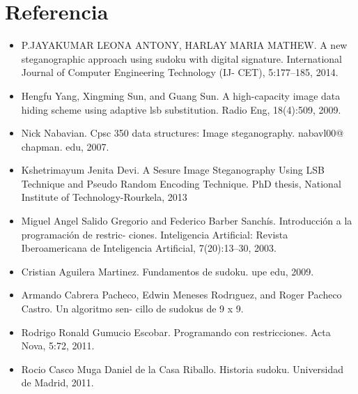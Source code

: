 \documentclass[14pt]{article}
\begin{document}
\newpage

\section{Referencia}
	\begin{itemize}
		\item  [\fbox {1}] P.JAYAKUMAR LEONA ANTONY, HARLAY MARIA MATHEW. A new steganographic approach using sudoku with digital signature. International Journal of Computer Engineering  Technology (IJ- CET), 5:177–185, 2014.
	\end{itemize}
	\begin{itemize}
	\item  [\fbox {2}] Hengfu Yang, Xingming Sun, and Guang Sun. A high-capacity image data hiding scheme using adaptive lsb substitution. Radio Eng, 18(4):509, 2009.
	\end{itemize}
		\begin{itemize}
	\item  [\fbox {3}] Nick Nabavian. Cpsc 350 data structures: Image steganography. nabavl00@ chapman. edu, 2007.
	\end{itemize}
		\begin{itemize}
	\item  [\fbox {4}] Kshetrimayum Jenita Devi. A Sesure Image Steganography Using LSB Technique and Pseudo Random Encoding Technique. PhD thesis, National Institute of Technology-Rourkela, 2013
	\end{itemize}
		\begin{itemize}
	\item  [\fbox {5}] Miguel Angel Salido Gregorio and Federico Barber Sanchís. Introducción a la programación de restric- ciones. Inteligencia Artificial: Revista Iberoamericana de Inteligencia Artificial, 7(20):13–30, 2003.
	\end{itemize}
		\begin{itemize}
	\item  [\fbox {6}] Cristian Aguilera Martinez. Fundamentos de sudoku. upe edu, 2009.
	\end{itemize}
		\begin{itemize}
	\item  [\fbox {7}] Armando Cabrera Pacheco, Edwin Meneses Rodrıguez, and Roger Pacheco Castro. Un algoritmo sen- cillo de sudokus de 9 x 9.
	\end{itemize}
		\begin{itemize}
	\item  [\fbox {8}] Rodrigo Ronald Gumucio Escobar. Programando con restricciones. Acta Nova, 5:72, 2011.
	\end{itemize}
		\begin{itemize}
	\item  [\fbox {9}] Rocio Casco Muga Daniel de la Casa Riballo. Historia sudoku. Universidad de Madrid, 2011.
	\end{itemize}

\newpage
	
\end{document}
